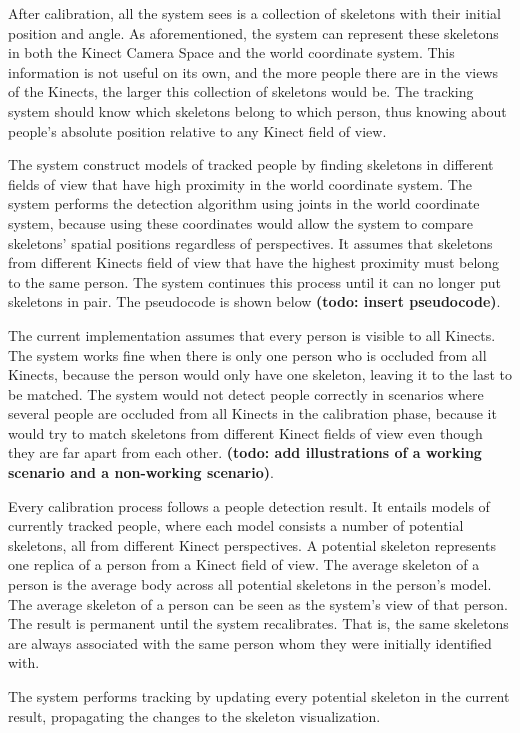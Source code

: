 After calibration, all the system sees is a collection of skeletons with their initial position and angle. As aforementioned, the system can represent these skeletons in both the Kinect Camera Space and the world coordinate system. This information is not useful on its own, and the more people there are in the views of the Kinects, the larger this collection of skeletons would be. The tracking system should know which skeletons belong to which person, thus knowing about people's absolute position relative to any Kinect field of view.

The system construct models of tracked people by finding skeletons in different fields of view that have high proximity in the world coordinate system. The system performs the detection algorithm using joints in the world coordinate system, because using these coordinates would allow the system to compare skeletons' spatial positions regardless of perspectives. It assumes that skeletons from different Kinects field of view that have the highest proximity must belong to the same person. The system continues this process until it can no longer put skeletons in pair. The pseudocode is shown below \textbf{(todo: insert pseudocode)}.

The current implementation assumes that every person is visible to all Kinects. The system works fine when there is only one person who is occluded from all Kinects, because the person would only have one skeleton, leaving it to the last to be matched. The system would not detect people correctly in scenarios where several people are occluded from all Kinects in the calibration phase, because it would try to match skeletons from different Kinect fields of view even though they are far apart from each other. \textbf{(todo: add illustrations of a working scenario and a non-working scenario)}.

Every calibration process follows a people detection result. It entails models of currently tracked people, where each model consists a number of potential skeletons, all from different Kinect perspectives. A potential skeleton represents one replica of a person from a Kinect field of view. The average skeleton of a person is the average body across all potential skeletons in the person's model. The average skeleton of a person can be seen as the system's view of that person. The result is permanent until the system recalibrates. That is, the same skeletons are always associated with the same person whom they were initially identified with. 

The system performs tracking by updating every potential skeleton in the current result, propagating the changes to the skeleton visualization.

